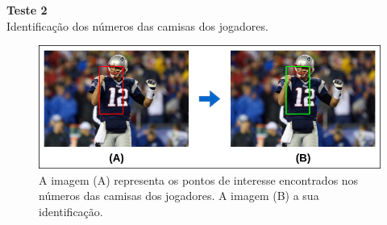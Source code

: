 \textbf{Teste 2}\\
Identificação dos números das camisas dos jogadores.

\begin{figure}
    \centering
    \caption{\label{fig_rec_numero}A imagem (A) representa os pontos de interesse encontrados nos números das camisas dos jogadores. A imagem (B) a sua identificação.}
    \includegraphics[scale=0.4]{05-SLIDES_DESENVOLVIMENTO/Etapa_de_Testes/imagens_testes/representacao_de_numeros.png}
\end{figure}